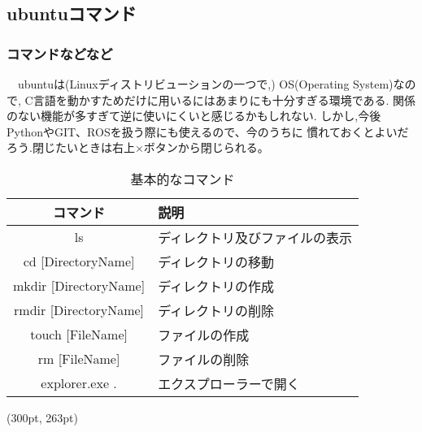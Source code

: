 \documentclass[dvipdfmx]{beamer}
\begin{document}
\subsection{ubuntuコマンド}
\begin{frame}[t, fragile]
    \frametitle{コマンドなどなど}
    　ubuntuは(Linuxディストリビューションの一つで,)
    OS(Operating System)なので,
   \textrm{C}言語を動かすためだけに用いるにはあまりにも十分すぎる環境である.
    関係のない機能が多すぎて逆に使いにくいと感じるかもしれない.
    しかし,今後PythonやGIT、ROSを扱う際にも使えるので、今のうちに
    慣れておくとよいだろう.閉じたいときは右上×ボタンから閉じられる。
    \begin{table}[h]
        \caption{基本的なコマンド}
        \label{commands}
        \centering
        \vspace{-5pt}
        \begin{tabular}{cl}
            \hline
            コマンド & 説明\\               
            \hline \hline
            ls & ディレクトリ及びファイルの表示\\
            cd [DirectoryName] & ディレクトリの移動\\
            mkdir [DirectoryName] & ディレクトリの作成\\
            rmdir [DirectoryName] & ディレクトリの削除\\
            touch [FileName] & ファイルの作成\\
            rm [FileName] & ファイルの削除\\
            explorer.exe . & エクスプローラーで開く\\
            \hline
        \end{tabular}
    \end{table}
    \begin{textblock*}{0.3\linewidth}(300pt, 263pt)
    \space
    \end{textblock*}
\end{frame}
\end{document}
